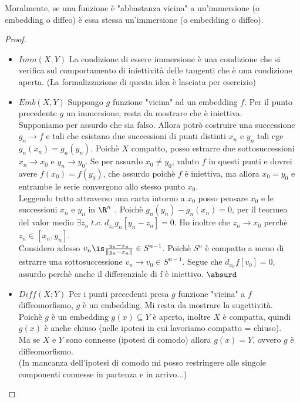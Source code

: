 Moralmente, se una funzione è "abbastanza vicina" a un'immersione (o embedding o diffeo) è essa stessa un'immersione (o embedding o diffeo).
\begin{proof}
\noindent
\begin{itemize}
\item $Imm(X,Y)$ La condizione di essere immersione è una condizione che si verifica sul comportamento di iniettività delle tangenti che è una condizione aperta. (La formalizzazione di questa idea è lasciata per esercizio)
\item $Emb(X,Y)$ Suppongo $g$ funzione "vicina" ad un embedding $f$. Per il punto precedente $g$ un immersione, resta da mostrare che è iniettiva. 
\\ Supponiamo per assurdo che sia falso. Allora potrò costruire una successione $g_n \rightarrow f$ e tali che esistano due successioni di punti distinti $x_n$ e $y_n$ tali cge $g_n(x_n) = g_n(y_n)$. 
Poichè $X$ compatto, posso estrarre due sottosuccessioni $x_n \rightarrow x_0$ e $y_n \rightarrow y_0$. Se per assurdo $x_0 \neq y_0$, valuto $f$ in questi punti e dovrei avere $f(x_0)=f(y_0)$, che assurdo poichè $f$ è iniettiva, ma allora $x_0=y_0$ e entrambe le serie convergono allo stesso punto $x_0$.
\\ Leggendo tutto attraverso una carta intorno a $x_0$ posso pensare $x_0$ e le successioni $x_n$ e $y_n$ in $\R^n$ .
Poichè $g_n(y_n)-g_n(x_n)=0$, per il teormea del valor medio $\exists z_n \; t.c.\; d_{z_n}g_n[y_n-z_n]=0$. Ho inoltre che $z_n \rightarrow x_0$ perchè $z_n \in [x_n,y_n]$.
\\ Considero adesso $v_n \is \frac{y_n-x_n}{\left \|y_n - x_n \right \|} \in S^{n-1}$. Poichè $S^n$ è compatto a meno di estrarre una sottosuccessione $v_n \rightarrow v_0 \in S^{n-1}$.
Segue che $d_{x_0}f[v_0]=0$, assurdo perchè anche il differenziale di f è iniettivo. $\absurd$
\item $Diff(X;Y)$ Per i punti precedenti presa $g$ funzione "vicina" a $f$ diffeomorfismo, $g$ è un embedding. Mi resta da mostrare la sugettività.\\
Poichè $g$ è un embedding $g(x) \subseteq Y$ è aperto, inoltre $X$ è compatta, quindi $g(x)$ è anche chiuso (nelle ipotesi in cui lavoriamo compatto = chiuso).
\\ Ma se $X$ e $Y$ sono connesse (ipotesi di comodo) allora $g(x) = Y$, ovvero $g$ è diffeomorfismo.\\
(In mancanza dell'ipotesi di comodo mi posso restringere alle singole componenti connesse in partenza e in arrivo...)
\end{itemize}
\end{proof}


